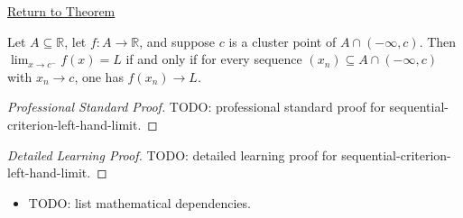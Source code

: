\newpage
{}
\label{prf:sequential-criterion-left-hand-limit}

\begin{remark*}[Return]
\hyperref[cor:sequential-criterion-left-hand-limit]{Return to Theorem}
\end{remark*}

\begin{corollary*}
Let $A\subseteq\mathbb{R}$, let $f:A\to\mathbb{R}$, and suppose $c$ is a
cluster point of $A\cap(-\infty,c)$. Then $\lim_{x\to c^-}f(x)=L$ if and
only if for every sequence $(x_n)\subseteq A\cap(-\infty,c)$ with
$x_n\to c$, one has $f(x_n)\to L$.

\smallskip\noindent
\end{corollary*}

\begin{proof}[Professional Standard Proof]
\LRAProofBodyStart
TODO: professional standard proof for sequential-criterion-left-hand-limit.
\end{proof}

\begin{proof}[Detailed Learning Proof]
\LRAProofBodyStart
TODO: detailed learning proof for sequential-criterion-left-hand-limit.
\end{proof}

\begin{remark*}
\end{remark*}

\begin{dependencies}
\begin{itemize}
  \item TODO: list mathematical dependencies.
\end{itemize}
\end{dependencies}

\clearpage
